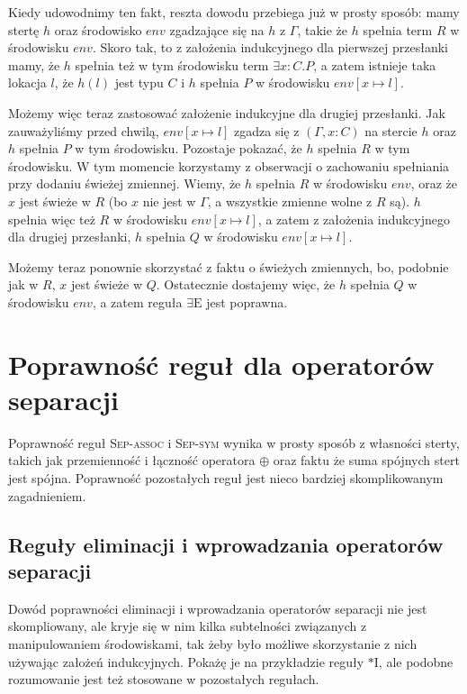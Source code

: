 \documentclass[]{pracamgr}
\renewcommand \| {\hspace{0.75em} | \hspace{0.75em} }
\renewcommand \[ {[\![}
\renewcommand \] {]\!]}
\theoremstyle{definition}
\begin{document}
Kiedy udowodnimy ten fakt, reszta dowodu przebiega już w prosty sposób:
mamy stertę $h$ oraz środowisko $env$ zgadzające się na $h$ z $\Gamma$, takie że
$h$ spełnia term $R$ w środowisku $env$. Skoro tak, to z założenia indukcyjnego dla
pierwszej przesłanki mamy, że $h$ spełnia też w tym środowisku term $\exists x : C . P$, a zatem
istnieje taka lokacja $l$, że $h(l)$ jest typu $C$ i $h$ spełnia $P$ w środowisku $env[x \mapsto l]$.

Możemy więc teraz zastosować założenie indukcyjne dla drugiej przesłanki.
Jak zauważyliśmy przed chwilą, $env[x \mapsto l]$ zgadza się z $(\Gamma, x : C)$ na stercie $h$ oraz
$h$ spełnia $P$ w tym środowisku. Pozostaje pokazać, że $h$ spełnia $R$ w tym środowisku.
W tym momencie korzystamy z obserwacji o zachowaniu spełniania przy dodaniu świeżej zmiennej.
Wiemy, że $h$ spełnia $R$ w środowisku $env$, oraz że $x$ jest świeże w $R$
(bo $x$ nie jest w $\Gamma$, a wszystkie zmienne wolne z $R$ są).
$h$ spełnia więc też $R$ w środowisku $env[x \mapsto l]$, a zatem z założenia indukcyjnego dla
drugiej przesłanki, $h$ spełnia $Q$ w środowisku $env[x \mapsto l]$.

Możemy teraz ponownie skorzystać z faktu o świeżych zmiennych, bo, podobnie jak w $R$,
$x$ jest świeże w $Q$. Ostatecznie dostajemy więc, że $h$ spełnia $Q$ w środowisku $env$, a zatem
reguła $\exists\mathrm{E}$ jest poprawna.

\section{Poprawność reguł dla operatorów separacji}
Poprawność reguł \textsc{Sep-assoc} i \textsc{Sep-sym} wynika w prosty sposób z własności sterty,
takich jak przemienność i łączność operatora $\oplus$ oraz faktu że suma spójnych stert jest spójna.
Poprawność pozostałych reguł jest nieco bardziej skomplikowanym zagadnieniem.

\subsection{Reguły eliminacji i wprowadzania operatorów separacji}
Dowód poprawności eliminacji i wprowadzania operatorów separacji nie jest skompliowany,
ale kryje się w nim kilka subtelności związanych z manipulowaniem środowiskami, tak
żeby było możliwe skorzystanie z nich używając założeń indukcyjnych.
Pokażę je na przykładzie reguły $*\mathrm{I}$, ale podobne rozumowanie jest też stosowane w
pozostałych regułach.
\end{document}

